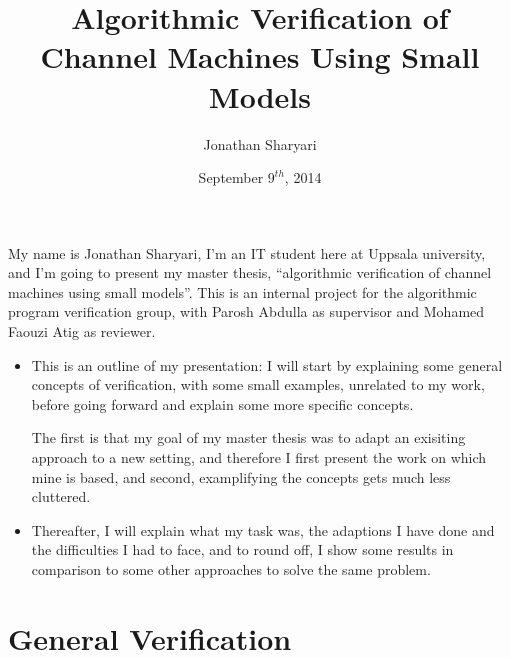 \documentclass[handout]{beamer}
\title[] %
{Algorithmic Verification of Channel Machines Using Small Models}
\author[J, Sharyari | \emph{sharyari@gmail.com}] {Jonathan Sharyari}
\date[2014-09-09] %
{September $9^{th}$, 2014}
\institute[Dept.\ of Information Technology]
{Department of Information Technology\\
  Uppsala University \\ \vspace{10pt}
  Supervisor: Parosh Abdulla \\
  Reviewer: Mohamed Faouzi Atig}
\begin{document}
\begin{footnotesize}
\begin{frame}[plain]
My name is Jonathan Sharyari, I'm an IT student here at Uppsala university, and I'm going to present my master thesis, ``algorithmic verification of channel machines using small models''. This is an internal project for the algorithmic program verification group, with Parosh Abdulla as supervisor and Mohamed Faouzi Atig as reviewer.
\end{frame}

\begin{frame}
\begin{itemize}
\item
This is an outline of my presentation: I will start by explaining some general concepts of verification, with some small examples, unrelated to my work, before going forward and explain some more specific concepts.

The first is that my goal of my master thesis was to adapt an exisiting approach to a new setting, and therefore I first present the work on which mine is based, and second, examplifying the concepts gets much less cluttered.
\item
Thereafter, I will explain what my task was, the adaptions I have done and the difficulties I had to face, and to round off, I show some results in comparison to some other approaches to solve the same problem.
\end{itemize}
\end{frame}


\section{General Verification}

\end{footnotesize}
\end{document}
